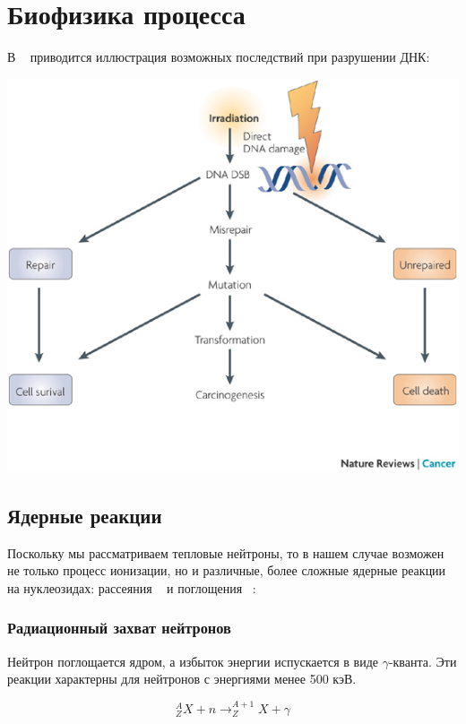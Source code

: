 \documentclass[11pt]{article}
\begin{document}
	\section{Биофизика процесса}
	В ~\cite{nrc2603} приводится иллюстрация возможных последствий при разрушении ДНК:
	
	\includegraphics[width=\textwidth]{Direct-DNA-damage-radiation-model-The-schematic-shows-the-standard-model-of-DNA-damage}
	
	\subsection{Ядерные реакции}
	Поскольку мы рассматриваем тепловые нейтроны, то в нашем случае возможен не только процесс ионизации, но и различные, более сложные ядерные реакции на нуклеозидах: рассеяния ~\cite{annurev-biophys-070317-033358} и поглощения ~\cite{Muhin, 27030255}:
	
	\subsubsection{Радиационный захват нейтронов}
	Нейтрон поглощается ядром, а избыток энергии испускается в виде $\gamma$-кванта. Эти реакции характерны для нейтронов с энергиями менее 500 кэВ.
	
	\begin{equation}
	\label{eq1}
	^A_ZX+n \rightarrow ^{A+1}_ZX + \gamma
	\end{equation}
\end{document}
